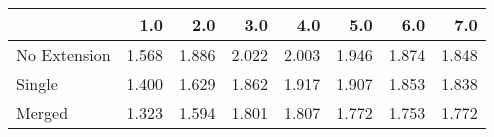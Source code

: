 \begin{tabular}{lrrrrrrr}
\toprule
{} &   1.0 &   2.0 &   3.0 &   4.0 &   5.0 &   6.0 &   7.0 \\
\midrule
No Extension & 1.568 & 1.886 & 2.022 & 2.003 & 1.946 & 1.874 & 1.848 \\
Single       & 1.400 & 1.629 & 1.862 & 1.917 & 1.907 & 1.853 & 1.838 \\
Merged       & 1.323 & 1.594 & 1.801 & 1.807 & 1.772 & 1.753 & 1.772 \\
\bottomrule
\end{tabular}
